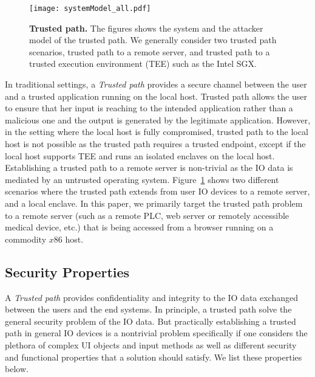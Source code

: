 \begin{figure}[t]
\centering
\texttt{[image: systemModel\_all.pdf]}
\caption{\textbf{Trusted path.} The figures shows the system and the attacker model of the trusted path. We generally consider two trusted path scenarios, \one trusted path to a remote server, and \two trusted path to a trusted execution environment (TEE) such as the Intel SGX.}
\spacesave
\label{fig:trustedPath}
\centering 
\end{figure}

In traditional settings, a \emph{Trusted path} provides a secure channel between the user and a trusted application running on the local host. Trusted path allows the user to ensure that her input is reaching to the intended application rather than a malicious one and the output is generated by the legitimate application. However, in the setting where the local host is fully compromised, trusted path to the local host is not possible as the trusted path requires a trusted endpoint, except if the local host supports TEE and runs an isolated enclaves on the local host. Establishing a trusted path to a remote server is non-trivial as the IO data is mediated by an untrusted operating system. Figure~\ref{fig:trustedPath} shows two different scenarios where the trusted path extends from user IO devices to \one a remote server, and \two a local enclave. %
In this paper, we primarily target the trusted path problem to a remote server (such as a remote PLC, web server or remotely accessible medical device, etc.) that is being accessed from a browser running on a commodity $x86$ host.

\iffalse
\subsection{Security Properties}

A \emph{Trusted path} provides confidentiality and integrity to the IO data exchanged between the users and the end systems. In principle, a trusted path solve the general security problem of the IO data. But practically establishing a trusted path in general IO devices is a nontrivial problem specifically if one considers the plethora of complex UI objects and input methods as well as different security and functional properties that a solution should satisfy. We list these properties below. 


